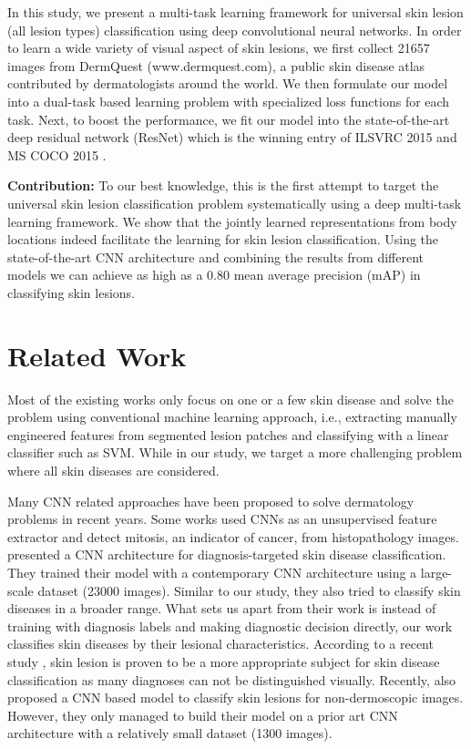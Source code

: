 \documentclass[letterpaper]{article}
\begin{document}
In this study, we present a multi-task learning framework for universal skin lesion (all lesion types)
classification using deep convolutional neural networks. In order to learn a
wide variety of visual aspect of skin lesions, we first collect 21657 images from
DermQuest (www.dermquest.com), a public skin disease atlas contributed
by dermatologists around the world. We then formulate our model into a dual-task
based learning problem with specialized loss functions for each task. Next, to
boost the performance, we fit our model into the state-of-the-art deep residual
network (ResNet) \cite{DBLP:journals/corr/HeZRS15}
which is the winning entry of ILSVRC 2015 \cite{DBLP:journals/ijcv/RussakovskyDSKS15} and
MS COCO 2015 \cite{DBLP:conf/eccv/LinMBHPRDZ14}.

\noindent \textbf{Contribution:} To our best knowledge, this is the first attempt to
target the universal skin lesion classification problem systematically using a deep
multi-task learning framework. We show that the jointly learned representations from
body locations indeed facilitate the learning for skin lesion classification. Using
the state-of-the-art CNN architecture and combining the results from different
models we can achieve as high as a 0.80 mean average precision (mAP) in classifying
skin lesions.

\section{Related Work}

Most of the existing works \cite{arroyo2014automated,xie2014dermoscopy,Fabbrocini:2014yq}
only focus on one or a few skin disease and solve the problem using conventional
machine learning approach, i.e., extracting manually engineered features from
segmented lesion patches and classifying with a linear classifier such as SVM.
While in our study, we target a more challenging problem where all skin diseases
are considered.

Many CNN related approaches have been proposed to solve dermatology problems in recent years.
Some works \cite{cruz2014automatic,wang2014cascaded,arevalo2015unsupervised} used
CNNs as an unsupervised feature extractor and detect mitosis, an indicator of cancer,
from histopathology images. \cite{esteva2015deep} presented a CNN architecture
for diagnosis-targeted skin disease classification. They trained their model
with a contemporary CNN architecture using a large-scale dataset (23000 images). Similar
to our study, they also tried to classify skin diseases in a broader range.
What sets us apart from their work is instead of training with diagnosis labels
and making diagnostic decision directly, our work classifies skin diseases by their
lesional characteristics. According to a recent study \cite{liao2016skin}, skin
lesion is proven to be a more appropriate subject for skin disease classification as
many diagnoses can not be distinguished visually. Recently, \cite{DBLP:conf/isbi/KawaharaBH16}
also proposed a CNN based model to classify skin lesions for non-dermoscopic images. However,
they only managed to build their model on a prior art CNN architecture with a relatively small
dataset (1300 images).
\end{document}
